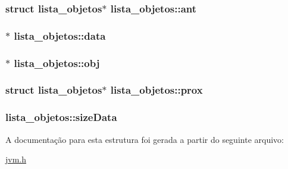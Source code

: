 \subsubsection[{\texorpdfstring{ant}{ant}}]{\setlength{\rightskip}{0pt plus 5cm}struct {\bf lista\+\_\+objetos}$\ast$ lista\+\_\+objetos\+::ant}\hypertarget{structlista__objetos_ae4e38254fa73e644ba9c1c52a8eab1cf}{}\label{structlista__objetos_ae4e38254fa73e644ba9c1c52a8eab1cf}
\subsubsection[{\texorpdfstring{data}{data}}]{$\ast$ lista\+\_\+objetos\+::data}\hypertarget{structlista__objetos_a4894afdae147a8afe842ff6d52b95baf}{}\label{structlista__objetos_a4894afdae147a8afe842ff6d52b95baf}
\subsubsection[{\texorpdfstring{obj}{obj}}]{$\ast$ lista\+\_\+objetos\+::obj}\hypertarget{structlista__objetos_a286f79d3a16de36ff111dbebe04db45e}{}\label{structlista__objetos_a286f79d3a16de36ff111dbebe04db45e}
\subsubsection[{\texorpdfstring{prox}{prox}}]{\setlength{\rightskip}{0pt plus 5cm}struct {\bf lista\+\_\+objetos}$\ast$ lista\+\_\+objetos\+::prox}\hypertarget{structlista__objetos_ace56ba58679d56ce8efbf2e144892d83}{}\label{structlista__objetos_ace56ba58679d56ce8efbf2e144892d83}
\subsubsection[{\texorpdfstring{size\+Data}{sizeData}}]{ lista\+\_\+objetos\+::size\+Data}\hypertarget{structlista__objetos_a699c168fb6c1ae4a32c6f4fac1bfe4e7}{}\label{structlista__objetos_a699c168fb6c1ae4a32c6f4fac1bfe4e7}


A documentação para esta estrutura foi gerada a partir do seguinte arquivo\+:\begin{DoxyCompactItemize}
\item 
\hyperlink{jvm_8h}{jvm.\+h}\end{DoxyCompactItemize}
